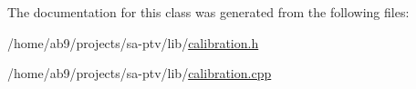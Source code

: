 The documentation for this class was generated from the following files\-:\begin{DoxyCompactItemize}
\item 
/home/ab9/projects/sa-\/ptv/lib/\hyperlink{calibration_8h}{calibration.\-h}\item 
/home/ab9/projects/sa-\/ptv/lib/\hyperlink{calibration_8cpp}{calibration.\-cpp}\end{DoxyCompactItemize}
